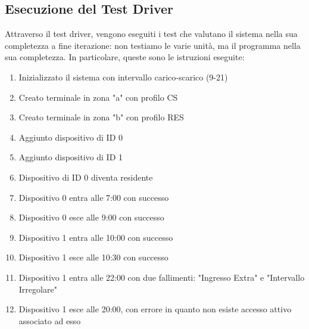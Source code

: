 \documentclass[12pt, letterpaper]{article}
\begin{document}
\subsection{Esecuzione del Test Driver}
Attraverso il test driver, vengono eseguiti 
i test che valutano il sistema nella sua completezza 
a fine iterazione: non testiamo le varie unità,
ma il programma nella sua completezza.
In particolare, queste sono le istruzioni eseguite:
\begin{enumerate}
    \item Inizializzato il sistema con intervallo 
    carico-scarico (9-21)
    \item Creato terminale in zona "a" con profilo CS
    \item Creato terminale in zona "b" con profilo RES 
    \item Aggiunto dispositivo di ID 0
    \item Aggiunto dispositivo di ID 1
    \item Dispositivo di ID 0 diventa residente 
    \item Dispositivo 0 entra alle 7:00 con successo 
    \item Dispositivo 0 esce alle 9:00 con successo
    \item Dispositivo 1 entra alle 10:00 con successo 
    \item Dispositivo 1 esce alle 10:30 con successo 
    \item Dispositivo 1 entra alle 22:00 con due 
    fallimenti: "Ingresso Extra" e "Intervallo 
    Irregolare"
    \item Dispositivo 1 esce alle 20:00, con errore 
    in quanto non esiste accesso attivo associato ad 
    esso
\end{enumerate}
\end{document}
